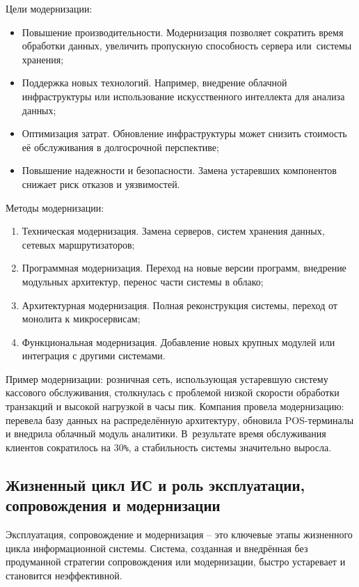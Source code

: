 \documentclass{ou}
\begin{document}
Цели модернизации:
\begin{itemize}[label=-, leftmargin=0em, itemindent=3.35em, nosep]
\item Повышение производительности. Модернизация позволяет сократить время обработки данных, увеличить пропускную способность сервера или~системы хранения;
\item Поддержка новых технологий. Например, внедрение облачной инфраструктуры или использование искусственного интеллекта для анализа данных;
\item Оптимизация затрат. Обновление инфраструктуры может снизить стоимость её обслуживания в долгосрочной перспективе;
\item Повышение надежности и безопасности. Замена устаревших компонентов снижает риск отказов и уязвимостей.
\end{itemize}

Методы модернизации:
\begin{enumerate}[leftmargin=0em, itemindent=3.75em, nosep, label=\arabic*)]
\item Техническая модернизация. Замена серверов, систем хранения данных, сетевых маршрутизаторов;
\item Программная модернизация. Переход на новые версии программ, внедрение модульных архитектур, перенос части системы в облако;
\item Архитектурная модернизация. Полная реконструкция системы, переход от монолита к микросервисам;
\item Функциональная модернизация. Добавление новых крупных модулей или интеграция с другими системами.
\end{enumerate}

Пример модернизации: розничная сеть, использующая устаревшую систему кассового обслуживания, столкнулась с проблемой низкой скорости обработки транзакций и высокой нагрузкой в часы пик. Компания провела модернизацию: перевела базу данных на распределённую архитектуру, обновила POS-терминалы и внедрила облачный модуль аналитики. В~результате время обслуживания клиентов сократилось на 30\verb|%|, а стабильность системы значительно выросла.
\subsection{Жизненный цикл ИС и роль эксплуатации, сопровождения и модернизации}
Эксплуатация, сопровождение и модернизация -- это ключевые этапы жизненного цикла информационной системы. Система, созданная и внедрённая без продуманной стратегии сопровождения или модернизации, быстро устаревает и становится неэффективной.
\end{document}
